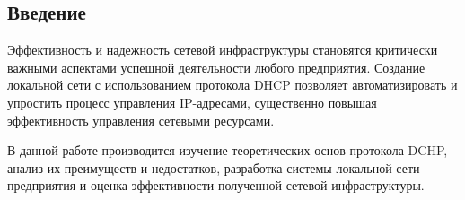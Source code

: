 \begin{center}
	\section*{Введение}
\end{center}

Эффективность и надежность сетевой инфраструктуры становятся критически важными аспектами успешной деятельности любого предприятия. Создание локальной сети с использованием протокола DHCP позволяет автоматизировать и упростить процесс управления IP-адресами, существенно повышая эффективность управления сетевыми ресурсами.

В данной работе производится изучение теоретических основ протокола DCHP, анализ их преимуществ и недостатков, разработка системы локальной сети предприятия и оценка эффективности полученной сетевой инфраструктуры.